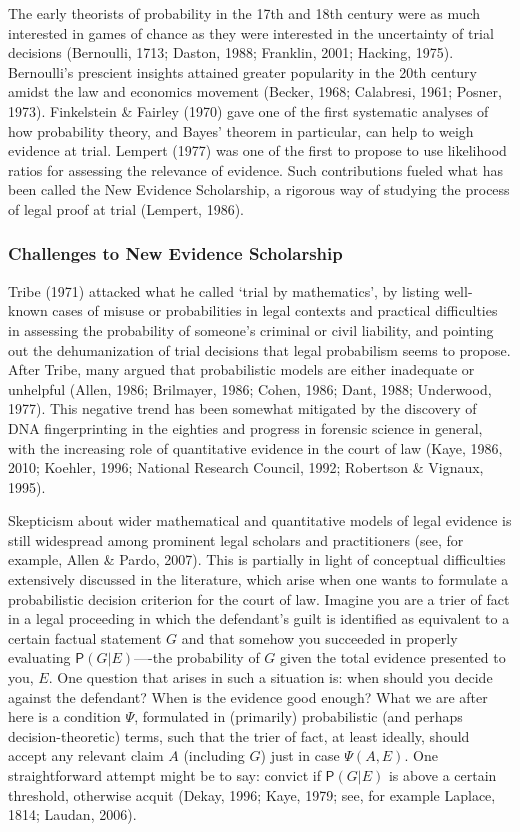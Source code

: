 \documentclass[11pt,dvipsnames,enabledeprecatedfontcommands]{scrartcl}
\newcommand{\pr}[1]{\mathsf{P}(#1)}
\begin{document}
The early theorists of probability in the 17th and 18th century were as
much interested in games of chance as they were interested in the
uncertainty of trial decisions (Bernoulli, 1713; Daston, 1988; Franklin,
2001; Hacking, 1975). Bernoulli's prescient insights attained greater
popularity in the 20th century amidst the law and economics movement
(Becker, 1968; Calabresi, 1961; Posner, 1973). Finkelstein \& Fairley
(1970) gave one of the first systematic analyses of how probability
theory, and Bayes' theorem in particular, can help to weigh evidence at
trial. Lempert (1977) was one of the first to propose to use likelihood
ratios for assessing the relevance of evidence. Such contributions
fueled what has been called the New Evidence Scholarship, a rigorous way
of studying the process of legal proof at trial (Lempert, 1986).

\subsubsection{Challenges to New Evidence
Scholarship}\label{challenges-to-new-evidence-scholarship}

Tribe (1971) attacked what he called `trial by mathematics', by listing
well-known cases of misuse or probabilities in legal contexts and
practical difficulties in assessing the probability of someone's
criminal or civil liability, and pointing out the dehumanization of
trial decisions that legal probabilism seems to propose. After Tribe,
many argued that probabilistic models are either inadequate or unhelpful
(Allen, 1986; Brilmayer, 1986; Cohen, 1986; Dant, 1988; Underwood,
1977). This negative trend has been somewhat mitigated by the discovery
of DNA fingerprinting in the eighties and progress in forensic science
in general, with the increasing role of quantitative evidence in the
court of law (Kaye, 1986, 2010; Koehler, 1996; National Research
Council, 1992; Robertson \& Vignaux, 1995).

Skepticism about wider mathematical and quantitative models of legal
evidence is still widespread among prominent legal scholars and
practitioners (see, for example, Allen \& Pardo, 2007). This is
partially in light of conceptual difficulties extensively discussed in
the literature, which arise when one wants to formulate a probabilistic
decision criterion for the court of law. Imagine you are a trier of fact
in a legal proceeding in which the defendant's guilt is identified as
equivalent to a certain factual statement \(G\) and that somehow you
succeeded in properly evaluating \(\pr{G\vert E}\)----the probability of
\(G\) given the total evidence presented to you, \(E\). One question
that arises in such a situation is: when should you decide against the
defendant? When is the evidence good enough? What we are after here is a
condition \(\Psi\), formulated in (primarily) probabilistic (and perhaps
decision-theoretic) terms, such that the trier of fact, at least
ideally, should accept any relevant claim \(A\) (including \(G\)) just
in case \(\Psi(A, E)\). One straightforward attempt might be to say:
convict if \(\pr{G\vert E}\) is above a certain threshold, otherwise
acquit (Dekay, 1996; Kaye, 1979; see, for example Laplace, 1814; Laudan,
2006).
\end{document}
